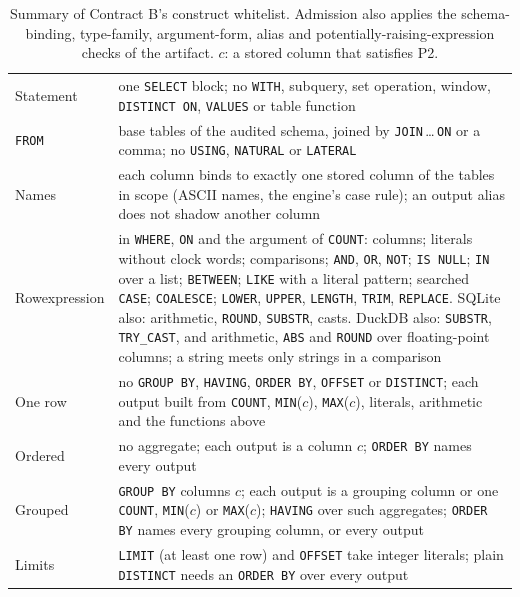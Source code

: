 \begin{table}[htbp]
  \caption{Summary of Contract B's construct whitelist. Admission also applies the schema-binding, type-family,
  argument-form, alias and potentially-raising-expression checks of the artifact. $c$: a stored column that satisfies P2.}
  \label{tab:contractb}
  \footnotesize\setlength{\tabcolsep}{3pt}
  \begin{tabular}{@{}L{1.25cm}L{6.7cm}@{}}
  \toprule
  Statement & one \texttt{SELECT} block; no \texttt{WITH}, subquery, set operation, window, \texttt{DISTINCT ON},
  \texttt{VALUES} or table function \\
  \texttt{FROM} & base tables of the audited schema, joined by \texttt{JOIN}\,\ldots\,\texttt{ON} or a comma; no
  \texttt{USING}, \texttt{NATURAL} or \texttt{LATERAL} \\
  Names & each column binds to exactly one stored column of the tables in scope (ASCII names, the engine's case
  rule); an output alias does not shadow another column \\
  Row\newline expression & in \texttt{WHERE}, \texttt{ON} and the argument of \texttt{COUNT}: columns; literals without
  clock words; comparisons; \texttt{AND}, \texttt{OR}, \texttt{NOT}; \texttt{IS NULL}; \texttt{IN} over a list;
  \texttt{BETWEEN}; \texttt{LIKE} with a literal pattern; searched \texttt{CASE}; \texttt{COALESCE};
  \texttt{LOWER}, \texttt{UPPER}, \texttt{LENGTH}, \texttt{TRIM}, \texttt{REPLACE}. SQLite also: arithmetic,
  \texttt{ROUND}, \texttt{SUBSTR}, casts. DuckDB also: \texttt{SUBSTR}, \texttt{TRY\_CAST}, and arithmetic,
  \texttt{ABS} and \texttt{ROUND} over floating-point columns; a string meets only strings in a comparison \\
  One row & no \texttt{GROUP BY}, \texttt{HAVING}, \texttt{ORDER BY}, \texttt{OFFSET} or \texttt{DISTINCT}; each
  output built from \texttt{COUNT}, \texttt{MIN}($c$), \texttt{MAX}($c$), literals, arithmetic and the functions above \\
  Ordered & no aggregate; each output is a column $c$; \texttt{ORDER BY} names every output \\
  Grouped & \texttt{GROUP BY} columns $c$; each output is a grouping column or one \texttt{COUNT},
  \texttt{MIN}($c$) or \texttt{MAX}($c$); \texttt{HAVING} over such aggregates; \texttt{ORDER BY} names every
  grouping column, or every output \\
  Limits & \texttt{LIMIT} (at least one row) and \texttt{OFFSET} take integer literals; plain \texttt{DISTINCT}
  needs an \texttt{ORDER BY} over every output \\
  \bottomrule
  \end{tabular}
\end{table}

